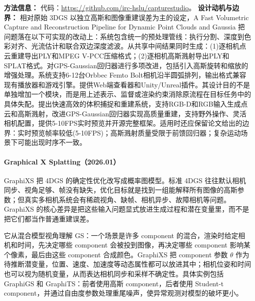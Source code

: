 \textbf{方法信息：} 代码：\url{https://github.com/irc-hslu/capturestudio}。
\textbf{设计动机与边界：} 相对原始 3DGS 以独立高斯和图像重建误差为主的设定，A Fast Volumetric Capture and Reconstruction Pipeline for Dynamic Point Clouds and Gaussia 把问题落在以下可实现的改动上：系统包含统一的预处理管线：执行分割、深度到色彩对齐、光流估计和联合双边深度滤波。从共享中间结果同时生成：(1)逐相机点云重建导出PLY和MPEG V-PCC压缩格式；(2)逐相机高斯溅射导出PLY和SPLAT格式。对GPS-Gaussian回归器进行多项改进，包括引入高斯旋转和缩放的增强处理。系统支持6-12台Orbbec Femto Bolt相机沿半圆弧排列，输出格式兼容现有播放器和游戏引擎。提供Web端查看器和Unity/Unreal插件。其设计目的不是单独增加一个模块，而是用上述表示、监督或渲染约束消除原流程在目标任务中的具体失配。提出快速高效的体积捕捉和重建系统，支持RGB-D和RGB输入生成点云和高斯溅射，改进GPS-Gaussian回归器实现高质量重建，支持野外操作、灵活相机配置，提供5-10FPS实时预览并开源完整框架。适用时还应保留论文给出的边界：实时预览帧率较低(5-10FPS)；高斯溅射质量受限于前馈回归器；复杂运动场景下可能出现时序不一致。
\paragraph{Graphical X Splatting（2026.01）\cite{2601_19843}}
GraphiXS 把 4DGS 的确定性优化改写成概率图模型。标准 4DGS 往往默认相机同步、视角足够、帧没有缺失，优化目标就是找到一组能解释所有图像的高斯参数；但真实多相机系统会有稀疏视角、缺帧、相机异步、故障相机等问题。GraphiXS 的核心差异是把这些输入问题显式放进生成过程和潜在变量里，而不是把它们都当作普通重建误差。

它从混合模型视角理解 GS：一个场景是许多 component 的混合，渲染时给定相机和时间，先决定哪些 component 会被投到图像，再决定哪些 component 影响某个像素，最后由这些 component 合成颜色。GraphiXS 把 component 参数 $\theta$ 作为待推断潜变量，位置、速度、加速度等动态属性都可以放进其中；相机位姿和时间也可以视为随机变量，从而表达相机同步和采样不确定性。具体实例包括 GraphiGS 和 GraphiTS：前者使用高斯 component，后者使用 Student-t component，并通过自由度参数处理重尾噪声，使异常观测对模型的破坏更小。

